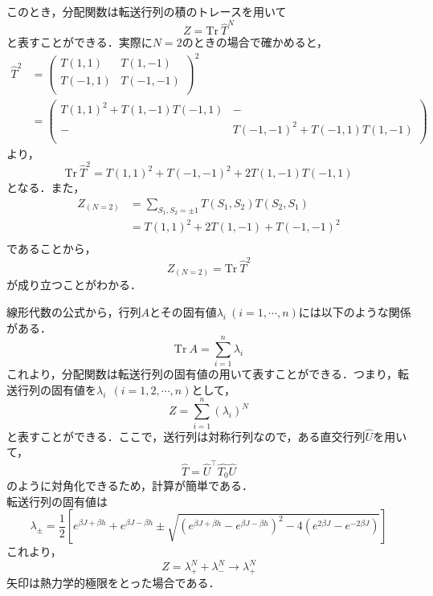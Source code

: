 \documentclass[a4paper,11pt]{jsarticle}
\begin{document}
このとき，分配関数は転送行列の積のトレースを用いて
\begin{equation*}
  Z = \text{Tr} \  \hat{T}^N
\end{equation*}
と表すことができる．実際に$N=2$のときの場合で確かめると，
\begin{align*}
  \hat{T}^2 &= 
  \begin{pmatrix}
    T(1,1) & T(1,-1) \\
    T(-1,1) & T(-1,-1) \\
  \end{pmatrix}^2\\
  &=
  \begin{pmatrix}
    T(1,1)^2 + T(1,-1)T(-1,1) & - \\
    - & T(-1,-1)^2 + T(-1,1)T(1,-1) \\
  \end{pmatrix}
\end{align*}
より，
\begin{equation*}
  \text{Tr} \ \hat{T}^2 = T(1,1)^2 + T(-1,-1)^2 + 2T(1,-1)T(-1,1)
\end{equation*}
となる．また，
\begin{align*}
  Z_{(N=2)} 
  &= \sum_{S_1, S_2 = \pm 1} T(S_1, S_2) T(S_2, S_1)\\
  &= T(1,1)^2 + 2T(1,-1) + T(-1,-1)^2\\ 
\end{align*}
であることから，
\begin{equation*}
   Z_{(N=2)} = \text{Tr} \ \hat{T}^2
\end{equation*}
が成り立つことがわかる．\par
線形代数の公式から，行列$A$とその固有値$\lambda_i \ (i=1,\cdots,n)$には以下のような関係がある．
\begin{equation*}
  \text{Tr} \ A = \sum_{i=1}^{n} \lambda_i
\end{equation*}
これより，分配関数は転送行列の固有値の用いて表すことができる．つまり，転送行列の固有値を$\lambda_i \ \ (i=1,2,\cdots,n)$として，
\begin{equation*}
  Z = \sum_{i=1}^n (\lambda_i)^N
\end{equation*}
と表すことができる．ここで，送行列は対称行列なので，ある直交行列$\hat{U}$を用いて，
\begin{equation*}
  \hat{T} = \hat{U}^{\top} \hat{T_0} \hat{U}
\end{equation*}
のように対角化できるため，計算が簡単である．\\
転送行列の固有値は
\begin{equation*}
  \lambda_{\pm} = \frac{1}{2}\left[ e^{\beta J + \beta h} + e^{\beta J - \beta h} \pm \sqrt{(e^{\beta J + \beta h} - e^{\beta J - \beta h})^2 - 4(e^{2\beta J}-e^{-2\beta J})} \right]
\end{equation*}
これより，
\begin{equation*}
  Z = \lambda_+^N + \lambda_-^N \rightarrow \lambda_+^N
\end{equation*}
矢印は熱力学的極限をとった場合である．
\end{document}
